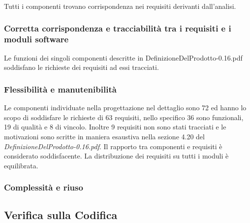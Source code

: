 Tutti i componenti trovano corrispondenza nei requisiti derivanti dall'analisi.

\subsubsection*{Corretta corrispondenza e tracciabilit\`a tra i requisiti e i
moduli software} 
Le funzioni dei singoli componenti descritte in DefinizioneDelProdotto-0.16.pdf
soddisfano le richieste dei requisiti ad essi tracciati.

\subsubsection*{Flessibilit\`a e manutenibilit\`a}
Le componenti individuate nella progettazione nel dettaglio sono 72 ed
hanno lo scopo di soddisfare le richieste di 63 requisiti, nello specifico 36
sono funzionali, 19 di qualit\`a e 8 di vincolo. Inoltre 9 requisiti non sono
stati tracciati e le motivazioni sono scritte in maniera esaustiva nella sezione
4.20 del \emph{DefinizioneDelProdotto-0.16.pdf}. Il rapporto tra componenti e
requisiti \`e considerato soddisfacente. La distribuzione dei
requisiti su tutti i moduli \`e equilibrata.

\subsubsection*{Complessit\`a e riuso}

\subsection{Verifica sulla Codifica}

